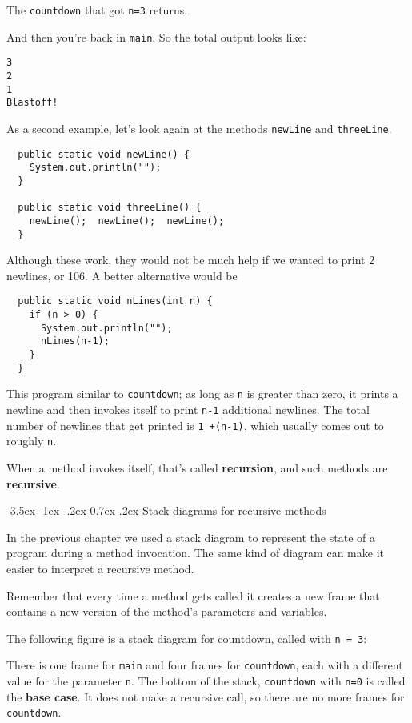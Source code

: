 \documentclass{book}
\makeatletter
\renewcommand{\section}{\@startsection 
    {section} {1} {0mm}%
    {-3.5ex \@plus -1ex \@minus -.2ex}%
    {0.7ex \@plus.2ex}%
    {\normalfont\Large\bfseries}}
\newcommand{\beforefig}{\vspace{1.3\parskip}}
\newcommand{\afterfig}{\vspace{-0.2\parskip}}
\newcommand{\myfig}[1]{
    \beforefig
    \centerline{\epsfig{#1,scale=0.8}}
    \afterfig
}
\makeatother
\begin{document}
The {\tt countdown} that got {\tt n=3} returns.

\noindent And then you're back in {\tt main}.  So the
total output looks like:

\begin{verbatim}
3
2
1
Blastoff!
\end{verbatim}
%
As a second example, let's look again at the methods
{\tt newLine} and {\tt threeLine}.

\begin{verbatim}
  public static void newLine() {
    System.out.println("");
  }

  public static void threeLine() {
    newLine();  newLine();  newLine();
  }
\end{verbatim}
%
Although these work, they would not be much help if we wanted
to print 2 newlines, or 106.  A better alternative would be

\begin{verbatim}
  public static void nLines(int n) {
    if (n > 0) {
      System.out.println("");
      nLines(n-1);
    }
  }
\end{verbatim}
%
This program similar to {\tt countdown}; as long as {\tt n} is greater
than zero, it prints a newline and then invokes itself to
print {\tt n-1} additional newlines.  The total number
of newlines that get printed is {\tt 1 +(n-1)}, which usually
comes out to roughly {\tt n}.


When a method invokes itself, that's called {\bf recursion}, and
such methods are {\bf recursive}.


\section{Stack diagrams for recursive methods}

In the previous chapter we used a stack diagram to represent the
state of a program during a method invocation.  The same kind
of diagram can make it easier to interpret a recursive method.

Remember that every time a method gets called it creates
a new frame that contains a new version of
the method's parameters and variables.

The following figure is a stack diagram for countdown, called
with {\tt n = 3}:

\myfig{figure=figs/stack2.eps}
% 
There is one frame for {\tt main} and four frames for {\tt countdown},
each with a different value for the parameter {\tt n}.  The bottom of
the stack, {\tt countdown} with {\tt n=0} is called the {\bf base
  case}.  It does not make a recursive call, so there are no more
frames for {\tt countdown}.
\end{document}

